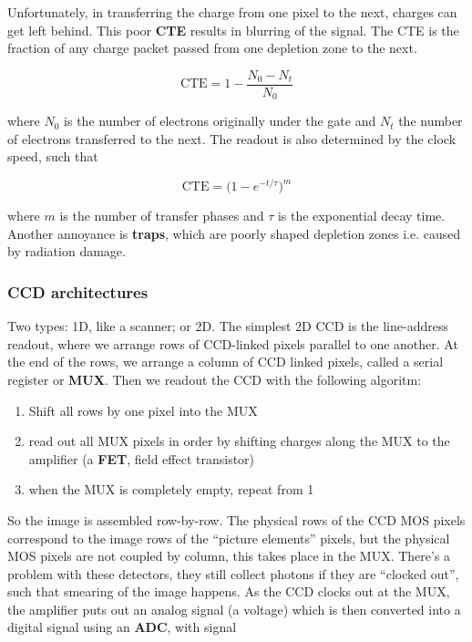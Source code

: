 \documentclass[a4paper]{article}
\begin{document}
\bigskip

Unfortunately, in transferring the charge from one pixel to the next, charges can get left behind. This poor \textbf{CTE} results in blurring of the signal. The CTE is the fraction of any charge packet passed from one depletion zone to the next. 

\begin{equation*}
    \text{CTE}=1-\frac{N_0-N_t}{N_0}
\end{equation*}

where $N_0$ is the number of electrons originally under the gate and $N_t$ the number of electrons transferred to the next. The readout is also determined by the clock speed, such that

\begin{equation*}
    \text{CTE}=\bigg(1-e^{-t/\tau}\bigg)^m
\end{equation*}

where $m$ is the number of transfer phases and $\tau$ is the exponential decay time. Another annoyance is \textbf{traps}, which are poorly shaped depletion zones i.e. caused by radiation damage. 

\subsubsection*{CCD architectures}

Two types: 1D, like a scanner; or 2D. The simplest 2D CCD is the line-address readout, where we arrange rows of CCD-linked pixels parallel to one another. At the end of the rows, we arrange a column of CCD linked pixels, called a serial register or \textbf{MUX}. Then we readout the CCD with the following algoritm:

\begin{enumerate}
    \item Shift all rows by one pixel into the MUX
    \item read out all MUX pixels in order by shifting charges along the MUX to the amplifier (a \textbf{FET}, field effect transistor)
    \item when the MUX is completely empty, repeat from 1
\end{enumerate}

So the image is assembled row-by-row. The physical rows of the CCD MOS pixels correspond to the image rows of the ``picture elements'' pixels, but the physical MOS pixels are not coupled by column, this takes place in the MUX. There's a problem with these detectors, they still collect photons if they are ``clocked out'', such that smearing of the image happens. As the CCD clocks out at the MUX, the amplifier puts out an analog signal (a voltage) which is then converted into a digital signal using an \textbf{ADC}, with signal
\end{document}
